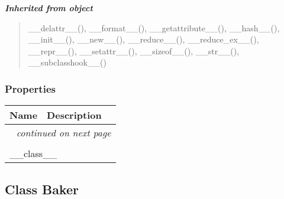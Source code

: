 \large{\textbf{\textit{Inherited from object}}}

\begin{quote}
\_\_delattr\_\_(), \_\_format\_\_(), \_\_getattribute\_\_(), \_\_hash\_\_(), \_\_init\_\_(), \_\_new\_\_(), \_\_reduce\_\_(), \_\_reduce\_ex\_\_(), \_\_repr\_\_(), \_\_setattr\_\_(), \_\_sizeof\_\_(), \_\_str\_\_(), \_\_subclasshook\_\_()
\end{quote}


  \subsubsection{Properties}

    \vspace{-1cm}
\hspace{\varindent}\begin{longtable}{|p{\varnamewidth}|p{\vardescrwidth}|l}
\cline{1-2}
\cline{1-2} \centering \textbf{Name} & \centering \textbf{Description}& \\
\cline{1-2}
\endhead\cline{1-2}\multicolumn{3}{r}{\small\textit{continued on next page}}\\\endfoot\cline{1-2}
\endlastfoot\multicolumn{2}{|l|}{\textit{Inherited from object}}\\
\multicolumn{2}{|p{\varwidth}|}{\raggedright \_\_class\_\_}\\
\cline{1-2}
\end{longtable}



\subsection{Class Baker}

